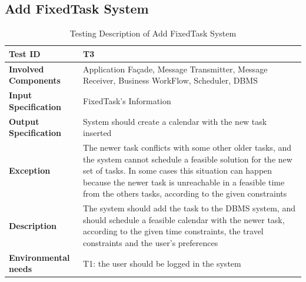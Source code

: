 \subsection*{Add FixedTask System}

\begin{table}[H]
    \centering
    \begin{tabular}{p{4.55cm} p{7cm}}
        
        \hline
        
        \textbf{Test ID}                & T3 \\
        
        \hline
        
        \textbf{Involved Components}    & Application Façade, Message Transmitter, Message Receiver, Business                                          WorkFlow, Scheduler, DBMS\\
        
        \hline
        
        \textbf{Input Specification}    & FixedTask's Information\\
        
        \hline
        
        \textbf{Output Specification}   & System should create a calendar with the new task inserted\\
        
        \hline
        
        \textbf{Exception}              & The newer task conflicts with some other older tasks, and the system cannot schedule a feasible solution for the new set of tasks. In some cases this situation can happen because the newer task is unreachable in a feasible time from the others tasks, according to the given constraints\\
        
        \hline
        
        \textbf{Description}            & The system should add the task to the DBMS system, and should schedule a feasible calendar with the newer task, according to the given time constraints, the travel constraints and the user's preferences\\
        \hline
        
        \textbf{Environmental needs}    & T1: the user should be logged in the system\\
        
        \hline
        
    \end{tabular}
    \caption{Testing Description of Add FixedTask System}
\end{table}




